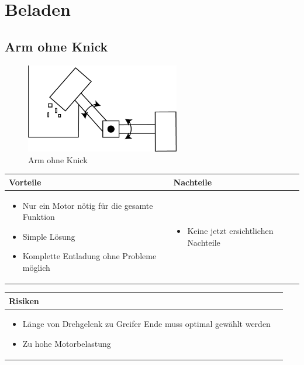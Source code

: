 
\section{Beladen}


\subsection{Arm ohne Knick}
\begin{figure} [hbp]
	\centering
	\includegraphics[width=0.6\textwidth]{fig/Beladen_1.png}
	\caption{Arm ohne Knick}
\end{figure}

\begin{table}[h]
\begin{tabular}{p{} | p{}}


 \textbf{Vorteile} & \textbf{Nachteile} \\ \hline
	 
\begin{itemize}
\item Nur ein Motor nötig für die gesamte Funktion
\item Simple Lösung
\item Komplette Entladung ohne Probleme möglich
\end{itemize}

 
 &
 
\begin{itemize}
\item Keine jetzt ersichtlichen Nachteile
\end{itemize}

\end{tabular}
\end{table}

\begin{table}[h]
\begin{tabular}{p{}p{}}


 \textbf{Risiken} & \\ \hline
	 
\begin{itemize}
\item Länge von Drehgelenk zu Greifer Ende muss optimal gewählt werden
\item Zu hohe Motorbelastung
\end{itemize}
 
\end{tabular}
\end{table}

